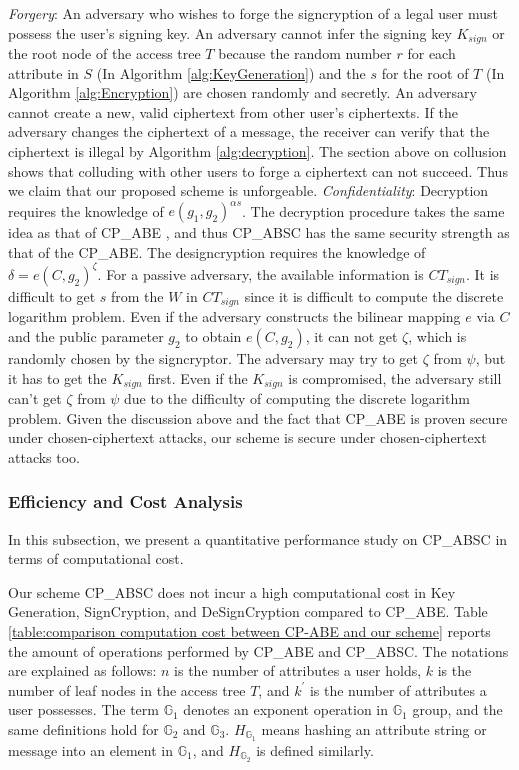 \documentclass[letterpaper,12pt]{article}
\newcommand{\Gone}{\mathbb{G}_1}
\newcommand{\Gtwo}{\mathbb{G}_2}
\newcommand{\Gthree}{\mathbb{G}_3}
\begin{document}
\emph{Forgery}: An adversary who wishes to forge the signcryption of a legal user must possess the user's signing key. An adversary cannot infer the signing key $K_{sign}$ or the root node of the access tree $T$ because the random number $r$ for each attribute in $S$  (In Algorithm \ref{alg:KeyGeneration}) and the $s$ for the root of $T$ (In Algorithm \ref{alg:Encryption}) are chosen randomly and secretly. An adversary cannot create a new, valid ciphertext from other user's ciphertexts.  If the adversary changes the ciphertext of a message, the receiver can verify that the ciphertext is illegal by Algorithm \ref{alg:decryption}. The section above on collusion shows that colluding with other users to forge a ciphertext can not succeed. Thus we claim that our proposed scheme is unforgeable. %
\vspace{-3mm}
\emph{Confidentiality}: Decryption requires the knowledge of $e(g_1,g_2)^{\alpha s}$.  The decryption procedure takes the same idea as that of CP\_ABE \cite{bethencourt2007ciphertext}, and thus CP\_ABSC has the same security strength as that of the CP\_ABE. The designcryption requires the knowledge of $\delta=e(C,g_2)^\zeta$. For a passive adversary, the available information is $CT_{sign}$. It is difficult to get $s$ from  the $W$ in $CT_{sign}$ since it is difficult to compute the discrete logarithm problem. Even if the adversary constructs the bilinear mapping $e$ via $C$ and the public parameter $g_2$ to obtain $e(C,g_2)$,  it can not get $\zeta$, which is randomly chosen by the signcryptor. The adversary may try to get $\zeta$ from $\psi$, but it has to get the $K_{sign}$ first. Even if the $K_{sign}$ is compromised, the adversary still can't get $\zeta$ from $\psi$ due to the difficulty of computing the discrete logarithm problem. Given the discussion above and the fact that CP\_ABE is proven secure under chosen-ciphertext attacks, our scheme is secure under chosen-ciphertext attacks too.

\vspace{-2mm}
\subsubsection{Efficiency and Cost Analysis}\label{sec:performance analysis}

In this subsection, we present a quantitative performance study on CP\_ABSC in terms of computational cost.


Our scheme CP\_ABSC does not incur a high computational cost in Key Generation, SignCryption, and DeSignCryption compared to CP\_ABE. Table \ref{table:comparison computation cost between CP-ABE and our scheme} reports the amount of operations performed by CP\_ABE and CP\_ABSC. The notations are explained as follows: $n$ is the number of attributes a user holds, $k$ is the number of leaf nodes in the access tree $T$, and $k^\prime$ is the number of attributes a user possesses. The term $\Gone$ denotes an exponent operation in $\Gone$ group, and the same definitions hold for $\Gtwo$ and $\Gthree$. $H_{\Gone}$ means hashing an attribute string or message into an element in $\Gone$, and $H_{\Gtwo}$ is defined similarly.
\end{document}
